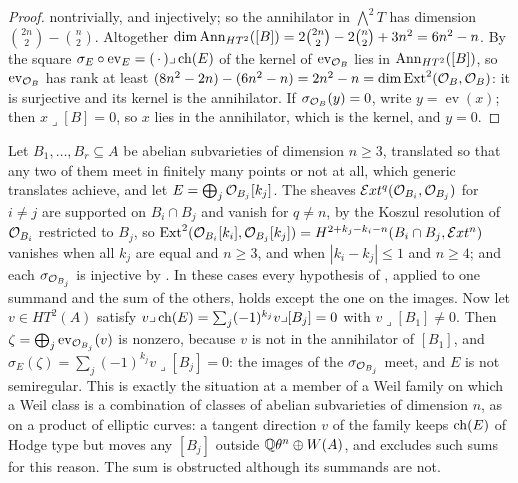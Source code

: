\begin{proof}
nontrivially, and injectively; so the annihilator in
${\textstyle\bigwedge^{2}}T$ has dimension $\binom{2n}{2}-\binom{n}{2}$.
Altogether $\dim\operatorname{Ann}_{HT^{2}}([B])=2\binom{2n}{2}-2\binom{n}{2}+3n^{2}
=6n^{2}-n$. By the square $\sigma_{E}\circ\operatorname{ev}_{E}=
(\,\cdot\,)\lrcorner\operatorname{ch}(E)$ of  the kernel of
$\operatorname{ev}_{\mathcal{O}_{B}}$ lies in $\operatorname{Ann}_{HT^{2}}([B])$, so
$\operatorname{ev}_{\mathcal{O}_{B}}$ has rank at least $(8n^{2}-2n)-(6n^{2}-n)
=2n^{2}-n=\dim\operatorname{Ext}^{2}(\mathcal{O}_{B},\mathcal{O}_{B})$: it is surjective and its kernel is
the annihilator. If $\sigma_{\mathcal{O}_{B}}(y)=0$, write $y=\operatorname{ev}(x)$;
then $x\lrcorner[B]=0$, so $x$ lies in the annihilator, which is the kernel,
and $y=0$.
\end{proof}

\begin{remark}\label{rem:absums}
Let $B_{1},\dots,B_{r}\subseteq A$ be abelian subvarieties of dimension
$n\ge3$, translated so that any two of them meet in finitely many points or
not at all, which generic translates achieve, and let $E=\bigoplus_{j}
\mathcal{O}_{B_{j}}[k_{j}]$. The sheaves $\mathcal{E}xt^{q}(\mathcal{O}_{B_{i}},\mathcal{O}_{B_{j}})$
for $i\ne j$ are supported on $B_{i}\cap B_{j}$ and vanish for $q\ne n$,
by the Koszul resolution of $\mathcal{O}_{B_{i}}$ restricted to $B_{j}$, so
$\operatorname{Ext}^{2}(\mathcal{O}_{B_{i}}[k_{i}],\mathcal{O}_{B_{j}}[k_{j}])=H^{2+k_{j}-k_{i}-n}
(B_{i}\cap B_{j},\mathcal{E}xt^{n})$ vanishes when all $k_{j}$ are equal and
$n\ge3$, and when $|k_{i}-k_{j}|\le1$ and $n\ge4$; and each
$\sigma_{\mathcal{O}_{B_{j}}}$ is injective by . In these cases
every hypothesis of , applied to one summand and the
sum of the others, holds except the one on the images. Now let $v\in HT^{2}(A)$
satisfy $v\lrcorner\operatorname{ch}(E)=\sum_{j}(-1)^{k_{j}}v\lrcorner[B_{j}]=0$ with
$v\lrcorner[B_{1}]\ne0$. Then $\zeta=\bigoplus_{j}\operatorname{ev}_{\mathcal{O}_{B_{j}}}(v)$
is nonzero, because $v$ is not in the annihilator of $[B_{1}]$, and
$\sigma_{E}(\zeta)=\sum_{j}(-1)^{k_{j}}v\lrcorner[B_{j}]=0$: the images of
the $\sigma_{\mathcal{O}_{B_{j}}}$ meet, and $E$ is not semiregular. This is exactly
the situation at a member of a Weil family on which a Weil class is a
combination of classes of abelian subvarieties of dimension $n$, as on a
product of elliptic curves: a tangent direction $v$ of the family keeps
$\operatorname{ch}(E)$ of Hodge type but moves any $[B_{j}]$ outside
$\mathbb{Q}\theta^{n}\oplus W(A)$, and  excludes such sums
for this reason. The sum is obstructed although its summands are not.
\end{remark}

